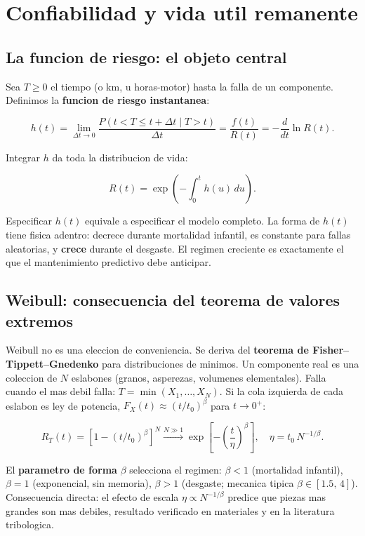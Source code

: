 \documentclass[11pt,a4paper]{article}
\begin{document}
\section{Confiabilidad y vida util remanente}

\subsection{La funcion de riesgo: el objeto central}

Sea $T \geq 0$ el tiempo (o km, u horas-motor) hasta la falla de un
componente. Definimos la \textbf{funcion de riesgo instantanea}:

$$h(t) = \lim_{\Delta t \to 0}
  \frac{P(t < T \leq t+\Delta t \mid T > t)}{\Delta t}
  = \frac{f(t)}{R(t)} = -\frac{d}{dt}\ln R(t).$$

Integrar $h$ da toda la distribucion de vida:

$$\boxed{R(t) = \exp\!\left(-\int_0^t h(u)\,du\right).}$$

Especificar $h(t)$ equivale a especificar el modelo completo.
La forma de $h(t)$ tiene fisica adentro: decrece durante mortalidad
infantil, es constante para fallas aleatorias, y \textbf{crece} durante
el desgaste. El regimen creciente es exactamente el que el mantenimiento
predictivo debe anticipar.

\subsection{Weibull: consecuencia del teorema de valores extremos}

Weibull no es una eleccion de conveniencia. Se deriva del
\textbf{teorema de Fisher--Tippett--Gnedenko} para distribuciones de minimos.
Un componente real es una coleccion de $N$ eslabones (granos, asperezas,
volumenes elementales). Falla cuando el mas debil falla:
$T = \min(X_1, \dots, X_N)$.
Si la cola izquierda de cada eslabon es ley de potencia,
$F_X(t) \approx (t/t_0)^\beta$ para $t \to 0^+$:

$$R_T(t) = [1-(t/t_0)^\beta]^N
  \xrightarrow{N \gg 1}
  \exp\!\left[-\left(\frac{t}{\eta}\right)^\beta\right], \quad
  \eta = t_0\,N^{-1/\beta}.$$

El \textbf{parametro de forma} $\beta$ selecciona el regimen:
$\beta < 1$ (mortalidad infantil), $\beta = 1$ (exponencial, sin memoria),
$\beta > 1$ (desgaste; mecanica tipica $\beta \in [1.5,\,4]$).
Consecuencia directa: el efecto de escala $\eta \propto N^{-1/\beta}$
predice que piezas mas grandes son mas debiles, resultado verificado en
materiales y en la literatura tribologica.
\end{document}
